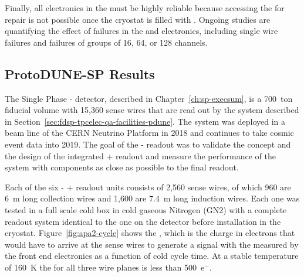 Finally, all electronics in the  must 
be highly reliable because accessing the  for repair is not possible once the cryostat is filled with . Ongoing studies are quantifying the effect of failures in the  and electronics, including single wire failures and failures of groups of \num{16}, \num{64}, or \num{128} channels.


\subsection{ProtoDUNE-SP Results}
\label{sec:fdsp-tpcelec-overview-pdune}


The Single Phase - detector, described in Chapter~\ref{ch:sp-execsum}, is a 700~ton fiducial volume  with 15,360 sense wires that are read out by the  system described in Section~\ref{sec:fdsp-tpcelec-qa-facilities-pdune}. The system was deployed in a beam line of the CERN Neutrino Platform in 2018 and continues to take cosmic event data into 2019. The goal of the -  readout was to validate the concept and the design of the integrated + readout and measure the performance of the  system with components as close as possible to the final   readout.

Each of the six - + readout units consists of 2,560 sense wires, of which 960 are \SI{6}{m} long collection wires and 1,600 are \SI{7.4}{m} long induction wires. Each one was tested in a full scale cold box in cold gaseous Nitrogen (GN2) with a complete  readout system identical to the one on the detector before installation in the cryostat. Figure~\ref{fig:apa2-cycle} shows the , which is the charge in electrons that would have to arrive at the sense wires to generate a signal with the \rms measured by the front end electronics as a function of cold cycle time. At a stable temperature of \SI{160}{K} the  for all three wire planes is less than 500~e$^-$.


